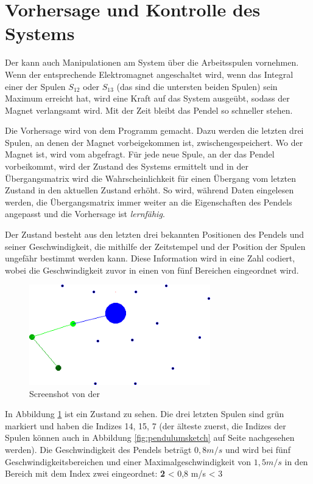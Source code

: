 \section{Vorhersage und Kontrolle des Systems}

Der  kann auch Manipulationen am System über die Arbeitsspulen vornehmen.
Wenn der entsprechende Elektromagnet angeschaltet wird, wenn das Integral einer der Spulen $S_{12}$ oder $S_{13}$ (das sind die untersten beiden Spulen) sein Maximum erreicht hat, wird eine Kraft auf das System ausgeübt, sodass der Magnet verlangsamt wird.
Mit der Zeit bleibt das Pendel so schneller stehen.

Die Vorhersage wird von dem Programm  gemacht.
Dazu werden die letzten drei Spulen, an denen der Magnet vorbeigekommen ist, zwischengespeichert.
Wo der Magnet ist, wird vom  abgefragt.
Für jede neue Spule, an der das Pendel vorbeikommt, wird der Zustand des Systems ermittelt und in der Übergangsmatrix wird die Wahrscheinlichkeit für einen Übergang vom letzten Zustand in den aktuellen Zustand erhöht.
So wird, während Daten eingelesen werden, die Übergangsmatrix immer weiter an die Eigenschaften des Pendels angepasst und die Vorhersage ist \textit{lernfähig}.

Der Zustand besteht aus den letzten drei bekannten Positionen des Pendels
und seiner Geschwindigkeit, die mithilfe der Zeitstempel und der Position der Spulen ungefähr bestimmt werden kann.
Diese Information wird in eine Zahl codiert, wobei die Geschwindigkeit zuvor in einen von fünf Bereichen eingeordnet wird.

\begin{figure}[hbt]
  \centering
  \includegraphics[width=0.7\textwidth]{images/prediction-white.png}
  \caption{Screenshot von der }
  \label{fig:screenmarkov}
\end{figure}

In Abbildung \ref{fig:screenmarkov} ist ein Zustand zu sehen.
Die drei letzten Spulen sind grün markiert und haben die Indizes 14, 15, 7 (der älteste zuerst, die Indizes der Spulen können auch in Abbildung \ref{fig:pendulumsketch} auf Seite \pageref{fig:pendulumsketch} nachgesehen werden).
Die Geschwindigkeit des Pendels beträgt $0,8 m/s$ und wird bei fünf Geschwindigkeitsbereichen und einer Maximalgeschwindigkeit von $1,5 m/s$ in den Bereich mit dem Index zwei eingeordnet:
\mathematik
\textbf{2}\cdot{} < 0,8 m/s < 3\cdot{}
\mathematikstop

